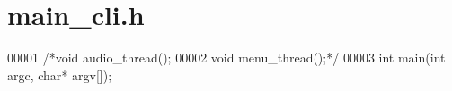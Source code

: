 \hypertarget{main__cli_8h_source}{\section{main\-\_\-cli.\-h}
}

\begin{DoxyCode}
00001 \textcolor{comment}{/*void audio\_thread();}
00002 \textcolor{comment}{void menu\_thread();*/}
00003 \textcolor{keywordtype}{int} main(\textcolor{keywordtype}{int} argc, \textcolor{keywordtype}{char}* argv[]);
\end{DoxyCode}
